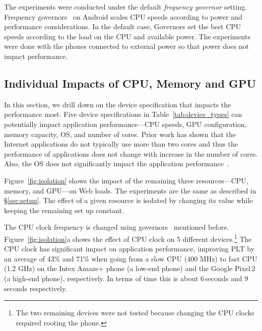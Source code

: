 The experiments were conducted under the default {\em frequency governor} setting. 
Frequency governors~\cite{ad-governors} on 
Android scales CPU speeds according to power and performance considerations. In the default case, 
Governors set the best CPU speeds according to the load on the CPU and available power. 
The experiments were done with the phones connected to external power so that
power does not impact performance. 




\subsection{Individual Impacts of CPU, Memory and GPU}
\label{sec:impact_cpu}
In this section, we drill down on the device specification that impacts the performance most. Five device specifications in Table~\ref{tab:device_types} can potentially impact application performance---CPU speeds, GPU configuration, memory capacity, OS, and number of cores. Prior work \cite{gao2015study,blake2010evolution} 
has shown that the Internet applications do not typically 
use more than two cores and thus the performance of applications does not change with increase in the number of cores. Also, the OS  does not significantly impact the application performance~\cite{corral2016preserving}. %

Figure~\ref{fig:isolation} shows the impact of the remaining three resources---CPU, memory, and GPU---on Web loads. The experiments are the same as described in \S\ref{sec:setup}. The effect of a given resource is isolated by changing its value while keeping the remaining set up constant. 

The CPU clock frequency is changed using governors~\cite{ad-governors} mentioned before. Figure~\ref{fig:isolation}a shows the effect of CPU clock on 5 different devices.\footnote{The two remaining devices were not tested because changing the CPU clocks required rooting the phone.} 
The CPU clock has significant impact on application performance, improving PLT by an average of 43\% and 71\% 
when going from a slow CPU (400 MHz) to fast CPU (1.2 GHz) on the Intex Amaze+ phone (a low-end phone) and the Google Pixel\,2 (a high-end phone), respectively. In terms of time this is about 6\,seconds 
and 9\,seconds respectively.

